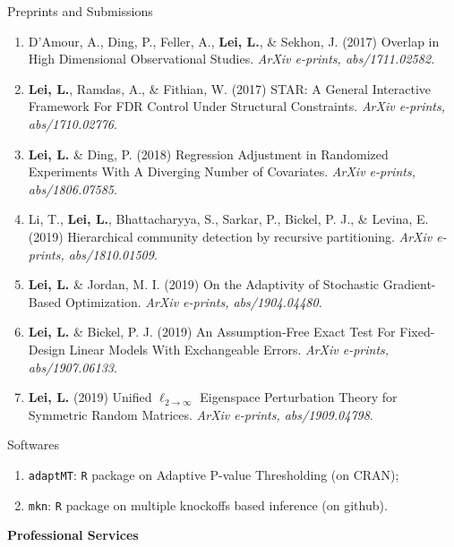\documentclass{article}
\begin{document}
\begin{large}
\noindent Preprints and Submissions
\end{large}

\begin{enumerate}
\item D'Amour, A., Ding, P., Feller, A., \textbf{Lei, L.}, \& Sekhon, J. (2017) Overlap in High Dimensional Observational Studies. \emph{ArXiv e-prints, abs/1711.02582.}
\item \textbf{Lei, L.}, Ramdas, A., \& Fithian, W. (2017) STAR: A General Interactive Framework For FDR Control Under Structural Constraints. \emph{ArXiv e-prints, abs/1710.02776}.
\item \textbf{Lei, L.} \& Ding, P. (2018) Regression Adjustment in Randomized Experiments With A Diverging Number of Covariates. \emph{ArXiv e-prints, abs/1806.07585}.
\item Li, T., \textbf{Lei, L.}, Bhattacharyya, S., Sarkar, P., Bickel, P. J., \& Levina, E. (2019) Hierarchical community detection by recursive partitioning. \emph{ArXiv e-prints, abs/1810.01509}.
\item \textbf{Lei, L.} \& Jordan, M. I. (2019) On the Adaptivity of Stochastic Gradient-Based Optimization. \emph{ArXiv e-prints, abs/1904.04480}.
\item \textbf{Lei, L.} \& Bickel, P. J. (2019) An Assumption-Free Exact Test For Fixed-Design Linear Models With Exchangeable Errors. \emph{ArXiv e-prints, abs/1907.06133}.
\item \textbf{Lei, L.} (2019) Unified $\ell_{2\rightarrow\infty}$ Eigenspace Perturbation Theory for Symmetric Random Matrices. \emph{ArXiv e-prints, abs/1909.04798}.
\end{enumerate}

\begin{large}
\noindent Softwares 
\end{large}

\begin{enumerate}
\item \texttt{adaptMT}: \texttt{R} package on Adaptive P-value Thresholding (on CRAN); 
\item \texttt{mkn}: \texttt{R} package on multiple knockoffs based inference (on github).
\end{enumerate}

\vspace{2mm}
\begin{large}
\noindent \textbf{Professional Services}
\end{large}
\vspace{5mm}
\end{document}

